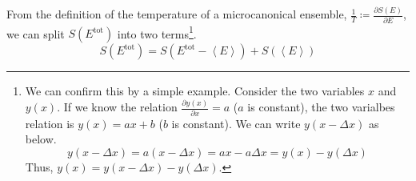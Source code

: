 \documentclass[a4paper,11pt]{article}
\begin{document}
From the definition of the temperature of a microcanonical ensemble, 
$
  \frac{1}{T}
  \coloneqq
  \frac{\partial S(E)}{\partial E}
$,
we can split $S(E^\mathrm{tot})$ into two terms\footnote
{
  We can confirm this by a simple example.
  Consider the two variables $x$ and $y(x)$. 
  If we know the relation $\frac{\partial y(x)}{\partial x}=a$ 
  ($a$ is constant),
  the two varialbes relation is $y(x) = ax+b$ ($b$ is constant).
  We can write $y(x-\Delta x)$ as below.
  \begin{equation*}
    y(x-\Delta x)
    = 
    a(x-\Delta x)
    = 
    ax-a\Delta x
    =
    y(x) - y(\Delta x)
  \end{equation*}
  Thus, $y(x) = y(x - \Delta x) - y(\Delta x)$.
}.
\begin{equation*}
  S(E^\mathrm{tot})
  =
  S(E^\mathrm{tot}-\left<E\right>)
  +
  S(\left<E\right>)
\end{equation*}
\end{document}

